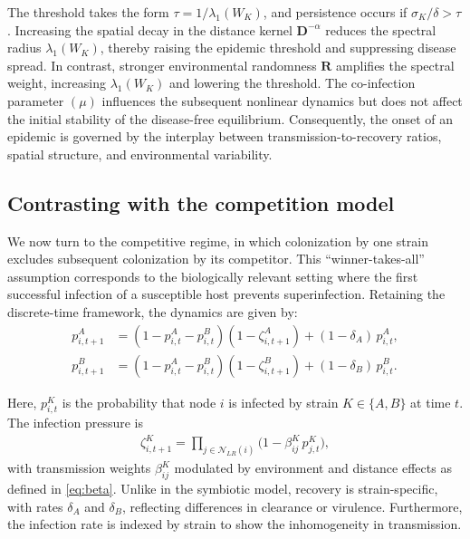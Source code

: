 \documentclass[a4paper,12pt]{scrartcl}
\theoremstyle{plain}%
\theoremstyle{definition}
\theoremstyle{remark}
\numberwithin{equation}{section}
\begin{document}
The threshold takes the form \(\tau = 1 / \lambda_1(W_K)\), and persistence occurs if \(\sigma_K / \delta > \tau\). Increasing the spatial decay in the distance kernel $\mathbf{D}^{-\alpha}$ reduces the spectral radius $\lambda_1(W_K)$, thereby raising the epidemic threshold and suppressing disease spread. In contrast, stronger environmental randomness $\mathbf{R}$ amplifies the spectral weight, increasing $\lambda_1(W_K)$ and lowering the threshold. The co-infection parameter $(\mu)$ influences the subsequent nonlinear dynamics but does not affect the initial stability of the disease-free equilibrium. Consequently, the onset of an epidemic is governed by the interplay between transmission-to-recovery ratios, spatial structure, and environmental variability.



\subsection{Contrasting with the competition model}

We now turn to the {competitive regime}, in which colonization by one strain excludes subsequent colonization by its competitor. This ``winner-takes-all'' assumption corresponds to the biologically relevant setting where the first successful infection of a susceptible host prevents superinfection. Retaining the discrete-time framework, the dynamics are given by:
\begin{align}
p_{i,t+1}^A &= (1 - p_{i,t}^A - p_{i,t}^B)(1 - \zeta_{i,t+1}^A) 
+ (1 - \delta_A)\,p_{i,t}^A, \label{eq:A_competition} \\
p_{i,t+1}^B &= (1 - p_{i,t}^A - p_{i,t}^B)(1 - \zeta_{i,t+1}^B) 
+ (1 - \delta_B)\,p_{i,t}^B. \label{eq:B_competition}
\end{align}

Here, \( p_{i,t}^K \) is the probability that node \( i \) is infected by strain \( K \in \{A,B\} \) at time \( t \). The infection pressure is
\begin{align}
\zeta_{i,t+1}^K = \prod_{j \in \mathcal{N}_{LR}(i)} \big(1 - \beta_{ij}^K \, p_{j,t}^K \big), \label{eq:zeta_competition}
\end{align}
with transmission weights \( \beta_{ij}^K \) modulated by environment and distance effects as defined in \autoref{eq:beta}. Unlike in the symbiotic model, recovery is strain-specific, with rates \( \delta_A \) and \( \delta_B \), reflecting differences in clearance or virulence. Furthermore, the infection rate is indexed by strain to show the inhomogeneity in transmission.
\end{document}
